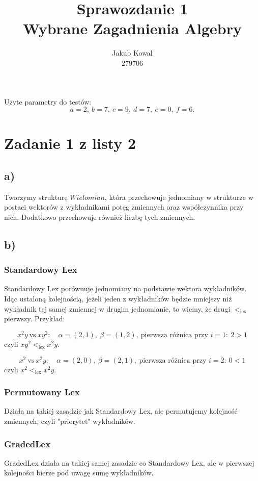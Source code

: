 \documentclass[12pt,a4paper]{article}
\title{\textbf{Sprawozdanie 1}\\Wybrane Zagadnienia Algebry}
\author{Jakub Kowal\\279706}
\date{}
\begin{document}
\maketitle

Użyte parametry do testów:
\[
a=2,\ b=7,\ c=9,\ d=7,\ e=0,\ f=6.
\]

\section*{Zadanie 1 z listy 2}

\subsection*{a)}
Tworzymy strukturę $Wielomian$, która przechowuje jednomiany w strukturze  w postaci wektorów z wykładnikami potęg zmiennych oraz współczynnika przy nich. Dodatkowo przechowuje również liczbę tych zmiennych.

\subsection*{b)}
\subsubsection*{Standardowy Lex}
Standardowy Lex porównuje jednomiany na podstawie wektora wykładników. Idąc ustaloną kolejnością, jeżeli jeden z wykładników będzie mniejszy niż wykładnik tej samej zmiennej w drugim jednomianie, to wiemy, że drugi $<_{\mathrm{lex}}$ pierwszy. Przykład: 

\[
x^2y\ \text{vs}\ xy^2:\quad
\alpha=(2,1),\ \beta=(1,2),\ \text{pierwsza różnica przy }i=1:\ 2>1
\]
czyli \(xy^2 <_{\mathrm{lex}} x^2y\).

\[
x^2\ \text{vs}\ x^2y:\quad
\alpha=(2,0),\ \beta=(2,1),\ \text{pierwsza różnica przy }i=2:\ 0<1
\]
czyli \(x^2 <_{\mathrm{lex}} x^2y\).

\subsubsection*{Permutowany Lex}
Działa na takiej zasadzie jak Standardowy Lex, ale permutujemy kolejność zmiennych, czyli "priorytet" wykładników.

\subsubsection*{GradedLex}
GradedLex działa na takiej samej zasadzie co Standardowy Lex, ale w pierwszej kolejności bierze pod uwagę sumę wykładników. 
\end{document}
